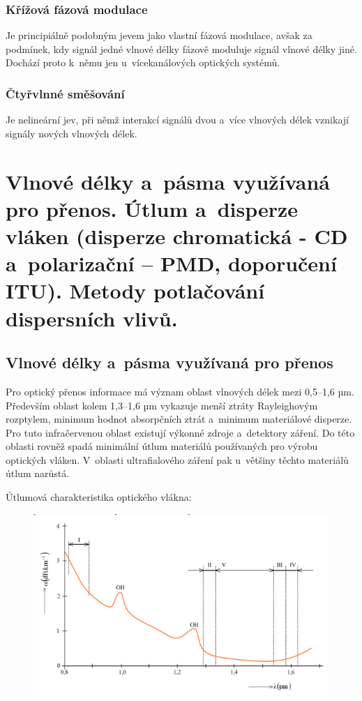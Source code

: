 \subsubsection{Křížová fázová modulace}
Je principiálně podobným jevem jako vlastní fázová modulace, avšak za podmínek, kdy signál jedné vlnové délky fázově moduluje signál vlnové délky jiné. Dochází proto k~němu jen u~vícekanálových optických systémů.

\subsubsection{Čtyřvlnné směšování}
Je nelineární jev, při němž interakcí signálů dvou a~více vlnových délek vznikají signály nových vlnových délek.

\clearpage
\section{Vlnové délky a~pásma využívaná pro přenos. Útlum a~disperze vláken (disperze chromatická - CD a~polarizační – PMD, doporučení ITU). Metody potlačování dispersních vlivů.}

\subsection{Vlnové délky a~pásma využívaná pro přenos}
Pro optický přenos informace má význam oblast vlnových délek mezi 0,5–1,6 µm. Především oblast kolem 1,3–1,6 µm vykazuje menší ztráty Rayleighovým rozptylem, minimum hodnot absorpčních ztrát a~minimum materiálové disperze. Pro tuto infračervenou oblast existují výkonné zdroje a~detektory záření. Do této oblasti rovněž spadá minimální útlum materiálů používaných pro výrobu optických vláken. V~oblasti ultrafialového záření pak u~většiny těchto materiálů útlum narůstá.

Útlumová charakteristika optického vlákna:
\begin{figure}[!ht]
  \begin{center}
    \includegraphics[scale=0.9]{obrazky/okna.png}
  \end{center}
\end{figure}

